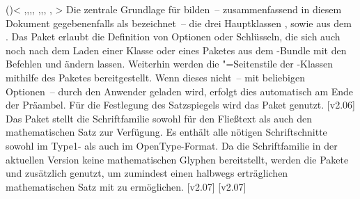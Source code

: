 \begin{DeclarePackages}
\itempkg{}()<%
    ,,,,%
    ,,,%
    ,%
  >%
  Die zentrale Grundlage für \TUDScript bilden~-- zusammenfassend in diesem 
  Dokument gegebenenfalls als  bezeichnet~-- die drei 
  Hauptklassen ,  sowie  aus dem 
  . Das Paket  erlaubt die 
  Definition von Optionen oder Schlüsseln, die sich auch noch nach dem Laden 
  einer Klasse oder eines Paketes aus dem \TUDScript-Bundle mit den Befehlen 
   und  ändern lassen. Weiterhin werden die 
  "=Seitenstile der \TUDScript-Klassen mithilfe des 
  Paketes  bereitgestellt. Wenn dieses nicht~-- mit 
  beliebigen Optionen~-- durch den Anwender geladen wird, erfolgt dies 
  automatisch am Ende der Präambel. Für die Festlegung des Satzspiegels wird
  das Paket  genutzt.
[v2.06]
  Das Paket  stellt die Schriftfamilie \OpenSans sowohl für 
  den Fließtext als auch den mathematischen Satz zur Verfügung. Es enthält alle 
  nötigen Schriftschnitte sowohl im Type1- als auch im OpenType-Format. Da die 
  Schriftfamilie in der aktuellen Version keine mathematischen Glyphen 
  bereitstellt, werden die Pakete  und  
  zusätzlich genutzt, um zumindest einen halbwegs erträglichen mathematischen 
  Satz mit \OpenSans zu ermöglichen.
  [v2.07]
  [v2.07]

\end{DeclarePackages}
